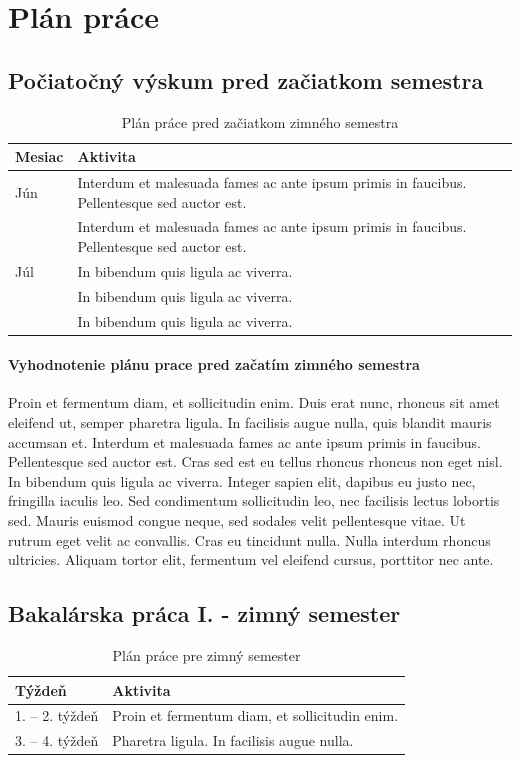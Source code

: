 \section {Plán práce}

\subsection*{Počiatočný výskum pred začiatkom semestra}
\begin{table}[H]
\centering
\begin{tabularx}{\textwidth}{lX}
\textbf{Mesiac} & \textbf{Aktivita} \\
\hline
Jún & Interdum et malesuada fames ac ante ipsum primis in faucibus. Pellentesque sed auctor est. \\
 & Interdum et malesuada fames ac ante ipsum primis in faucibus. Pellentesque sed auctor est. \\
 
\hline
Júl & In bibendum quis ligula ac viverra. \\
 & In bibendum quis ligula ac viverra. \\
 & In bibendum quis ligula ac viverra. \\
\hline
\end{tabularx}
\caption{Plán práce pred začiatkom zimného semestra}
\label{tab:summer-plan}
\end{table}

\paragraph{Vyhodnotenie plánu prace pred začatím zimného semestra}
Proin et fermentum diam, et sollicitudin enim. Duis erat nunc, rhoncus sit amet eleifend ut, semper pharetra ligula. In facilisis augue nulla, quis blandit mauris accumsan et. Interdum et malesuada fames ac ante ipsum primis in faucibus. Pellentesque sed auctor est. Cras sed est eu tellus rhoncus rhoncus non eget nisl. In bibendum quis ligula ac viverra. Integer sapien elit, dapibus eu justo nec, fringilla iaculis leo. Sed condimentum sollicitudin leo, nec facilisis lectus lobortis sed. Mauris euismod congue neque, sed sodales velit pellentesque vitae. Ut rutrum eget velit ac convallis. Cras eu tincidunt nulla. Nulla interdum rhoncus ultricies. Aliquam tortor elit, fermentum vel eleifend cursus, porttitor nec ante.

\subsection*{Bakalárska práca I. - zimný semester}
\begin{table}[H]
\centering
\begin{tabularx}{\textwidth}{lX}
\textbf{Týždeň} & \textbf{Aktivita} \\
\hline
1. – 2. týždeň & Proin et fermentum diam, et sollicitudin enim. \\
3. – 4. týždeň & Pharetra ligula. In facilisis augue nulla. \\
\hline
\end{tabularx}
\caption{Plán práce pre zimný semester}
\label{tab:winter-plan}
\end{table}

